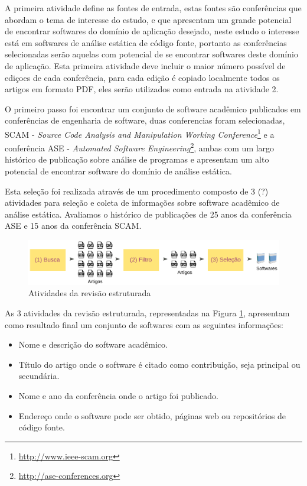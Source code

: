 A primeira atividade define as fontes de entrada,
estas fontes são conferências que abordam o tema de interesse do estudo, e
que apresentam um grande potencial de encontrar softwares do domínio de
aplicação desejado, neste estudo o interesse está em softwares de análise
estática de código fonte, portanto as conferências selecionadas serão
aquelas com potencial de se encontrar softwares deste domínio de aplicação.
Esta primeira atividade deve incluir o maior número possível de ediçoes de
cada conferência, para cada edição é copiado localmente todos os artigos em
formato PDF, eles serão utilizados como entrada na atividade 2.

O primeiro passo foi encontrar um conjunto de software acadêmico publicados em
conferências de engenharia de software, duas conferencias foram selecionadas,
SCAM - {\it Source Code Analysis and Manipulation Working
Conference}\footnote{\url{http://www.ieee-scam.org}} e a conferência ASE - {\it
Automated Software Engineering}\footnote{\url{http://ase-conferences.org}},
ambas com um largo histórico de publicação sobre análise de programas e
apresentam um alto potencial de encontrar software do domínio de análise
estática.

Esta seleção foi realizada através de um procedimento composto de 3 (?)
atividades para seleção e coleta de informações sobre software acadêmico de
análise estática. Avaliamos o histórico de publicações de 25 anos da
conferência ASE e 15 anos da conferência SCAM.

\begin{figure}[h]
  \center
  \includegraphics[scale=0.21]{imagens/revisao-estruturada.png}
  \caption{Atividades da revisão estruturada}
  \label{figura-revisao-estruturada}
\end{figure}

As 3 atividades da revisão estruturada, representadas na Figura
\ref{figura-revisao-estruturada}, apresentam como resultado final um conjunto
de softwares com as seguintes informações:

\begin{itemize}
  \item Nome e descrição do software acadêmico.
  \item Título do artigo onde o software é citado como contribuição, seja principal ou secundária.
  \item Nome e ano da conferência onde o artigo foi publicado.
  \item Endereço onde o software pode ser obtido, páginas web ou repositórios de código fonte.
\end{itemize}

